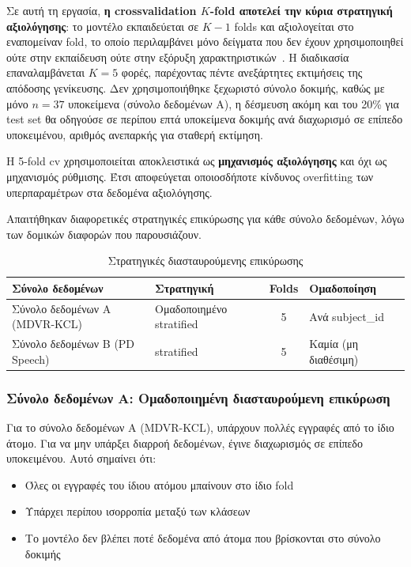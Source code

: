 Σε αυτή τη εργασία, \textbf{η \gls{crossvalidation} $K$-fold αποτελεί την κύρια στρατηγική αξιολόγησης}: 
το μοντέλο εκπαιδεύεται σε $K-1$ folds και αξιολογείται στο εναπομείναν fold, το οποίο περιλαμβάνει μόνο δείγματα που δεν έχουν χρησιμοποιηθεί ούτε στην εκπαίδευση ούτε στην εξόρυξη χαρακτηριστικών~\citep{bishop2006pattern}. 
Η διαδικασία επαναλαμβάνεται $K=5$ φορές, παρέχοντας πέντε ανεξάρτητες εκτιμήσεις της απόδοσης γενίκευσης. 
Δεν χρησιμοποιήθηκε ξεχωριστό σύνολο δοκιμής, καθώς με μόνο $n=37$ υποκείμενα (σύνολο δεδομένων A), η δέσμευση ακόμη και του 20\% για test set θα οδηγούσε σε περίπου επτά υποκείμενα δοκιμής ανά διαχωρισμό σε επίπεδο υποκειμένου, αριθμός ανεπαρκής για σταθερή εκτίμηση. 

H 5-fold \gls{cv} χρησιμοποιείται αποκλειστικά ως \textbf{μηχανισμός αξιολόγησης} και όχι ως μηχανισμός ρύθμισης. 
Έτσι αποφεύγεται οποιοσδήποτε κίνδυνος \gls{overfitting} των υπερπαραμέτρων στα δεδομένα αξιολόγησης.

Απαιτήθηκαν διαφορετικές στρατηγικές επικύρωσης για κάθε σύνολο δεδομένων, λόγω των δομικών διαφορών που παρουσιάζουν.

\begin{table}[H]
\centering
\small
\begin{tabular}{@{}p{}p{}cp{}@{}}
\toprule
\textbf{Σύνολο δεδομένων} & \textbf{Στρατηγική} & \textbf{Folds} & \textbf{Ομαδοποίηση} \\
\midrule
Σύνολο δεδομένων A (MDVR-KCL) & Ομαδοποιημένο stratified & 5 & Ανά subject\_id \\
Σύνολο δεδομένων B (PD Speech) & stratified & 5 & Καμία (μη διαθέσιμη) \\
\bottomrule
\end{tabular}
\caption{Στρατηγικές διασταυρούμενης επικύρωσης}
\label{tab:cv-strategies}
\end{table}

\subsubsection{Σύνολο δεδομένων A: Ομαδοποιημένη διασταυρούμενη επικύρωση}

Για το σύνολο δεδομένων A (MDVR-KCL), υπάρχουν πολλές εγγραφές από το ίδιο άτομο. Για να μην υπάρξει διαρροή δεδομένων, έγινε διαχωρισμός σε επίπεδο υποκειμένου. Αυτό σημαίνει ότι:

\begin{itemize}
    \item Όλες οι εγγραφές του ίδιου ατόμου μπαίνουν στο ίδιο fold
    \item Υπάρχει περίπου ισορροπία μεταξύ των κλάσεων
    \item Το μοντέλο δεν βλέπει ποτέ δεδομένα από άτομα που βρίσκονται στο σύνολο δοκιμής
\end{itemize}

